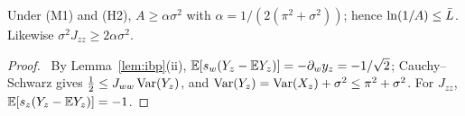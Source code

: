\begin{lemma}\label{lem:CR}
Under \textup{(M1)} and \textup{(H2)}, $A\ge\alpha\sigma^2$ with $\alpha=1/(2(\pi^2+\sigma^2))$; hence $\ln(1/A)\le\bar L$. Likewise $\sigma^2J_{zz}\ge2\alpha\sigma^2$.
\end{lemma}
\begin{proof}\proofst\
By Lemma~\ref{lem:ibp}(ii), $\mathbb{E}[s_w(Y_z-\mathbb{E} Y_z)]=-\partial_wy_z=-1/\sqrt2$; Cauchy--Schwarz gives $\frac12\le J_{ww}\operatorname{Var}(Y_z)$, and $\operatorname{Var}(Y_z)=\operatorname{Var}(X_z)+\sigma^2\le\pi^2+\sigma^2$. For $J_{zz}$, $\mathbb{E}[s_z(Y_z-\mathbb{E} Y_z)]=-1$.
\end{proof}
